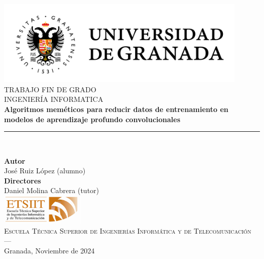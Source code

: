 
\begin{titlepage}


    \newlength{\centeroffset}
    \setlength{\centeroffset}{-0.5\oddsidemargin}
    \addtolength{\centeroffset}{0.5\evensidemargin}
    \thispagestyle{empty}

    \noindent\hspace*{\centeroffset}\begin{minipage}{\textwidth}

        \centering
        \includegraphics[width=0.9\textwidth]{imagenes/logo_ugr.jpg}\\[1.4cm]

        \textsc{ \Large TRABAJO FIN DE GRADO\\[0.2cm]}
        \textsc{ INGENIERÍA INFORMATICA }\\[1cm]
        {\Huge\bfseries Algoritmos meméticos para reducir datos de entrenamiento en modelos de aprendizaje profundo convolucionales\\
        }
        \vspace{0.2cm}
        \noindent\rule[-1ex]{\textwidth}{3pt}\\[3.5ex]

        \vspace{0.4cm}

        \textbf{Autor}\\ {José Ruiz López (alumno)}\\[2.5ex]
        \textbf{Directores}\\
        {Daniel Molina Cabrera (tutor)}\\
        \vspace{0.6cm}
        \includegraphics[width=0.3\textwidth]{imagenes/etsiit_logo.png}\\[0.1cm]
        \textsc{Escuela Técnica Superior de Ingenierías Informática y de Telecomunicación}\\
        \textsc{---}\\
        Granada, Noviembre de 2024
    \end{minipage}
\end{titlepage}



